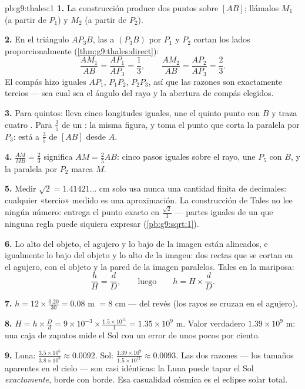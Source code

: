\begin{solution}{pb:g9:thales:1}
\textbf{1.} La construcción produce dos puntos sobre $[AB]$;
llámalos $M_1$ (a partir de $P_1$) y $M_2$ (a partir de $P_2$).

\textbf{2.} En el triángulo $A P_3 B$, las  a
$(P_3 B)$ por $P_1$ y $P_2$ cortan los lados
proporcionalmente (\cref{thm:g9:thales:direct}):
\[
\frac{A M_1}{AB} = \frac{A P_1}{A P_3} = \frac13,
\qquad
\frac{A M_2}{AB} = \frac{A P_2}{A P_3} = \frac23 .
\]
El compás hizo iguales $A P_1$, $P_1 P_2$, $P_2 P_3$, así que las
razones son exactamente tercios --- sea cual sea el ángulo del rayo y
la abertura de compás elegidos.

\textbf{3.} Para quintos: lleva cinco longitudes iguales, une el
quinto punto con $B$ y traza cuatro . Para $\frac35$ de un
: la misma figura, y toma el punto que corta la paralela
por $P_3$: está a $\frac{3}{5}$ de $[AB]$ desde $A$.

\textbf{4.} $\frac{AM}{MB} = \frac23$ significa
$AM = \frac25 AB$: cinco pasos iguales sobre el rayo, une $P_5$ con
$B$, y la paralela por $P_2$ marca $M$.

\textbf{5.} Medir $\sqrt2 = 1.41421\ldots$ cm solo usa nunca
una cantidad finita de decimales: cualquier «tercio» medido es una
aproximación. La construcción de Tales no lee ningún número:
entrega el punto exacto en $\frac{\sqrt2}{3}$ --- partes iguales
de un  que ninguna regla puede siquiera expresar
(\cref{pb:g9:sqrt:1}).

\textbf{6.} Lo alto del objeto, el agujero y lo bajo de la imagen
están alineados, e igualmente lo bajo del objeto y lo alto de la
imagen: dos rectas que se cortan en el agujero, con el objeto
y la pared de la imagen paralelos. Tales en la mariposa:
\[
\frac{h}{H} = \frac{d}{D},
\qquad\text{luego}\qquad
h = H \times \frac dD .
\]

\textbf{7.} $h = 12 \times \frac{0.20}{30} = 0.08$ m $= 8$ cm
--- del revés (los rayos se cruzan en el agujero).

\textbf{8.} $H = h \times \frac Dd = 9 \times 10^{-3} \times
\frac{1.5 \times 10^{11}}{1} = 1.35 \times 10^{9}$ m. Valor
verdadero $1.39 \times 10^9$ m: una caja de zapatos mide el Sol con
un error de unos pocos por ciento.

\textbf{9.} Luna: $\frac{3.5 \times 10^6}{3.8 \times 10^8}
\approx 0.0092$. Sol: $\frac{1.39 \times 10^9}{1.5 \times
10^{11}} \approx 0.0093$. Las dos razones --- los tamaños aparentes
en el cielo --- son casi idénticas: la Luna puede tapar el Sol
\emph{exactamente}, borde con borde. Esa casualidad cósmica es el eclipse
solar total.


\end{solution}
